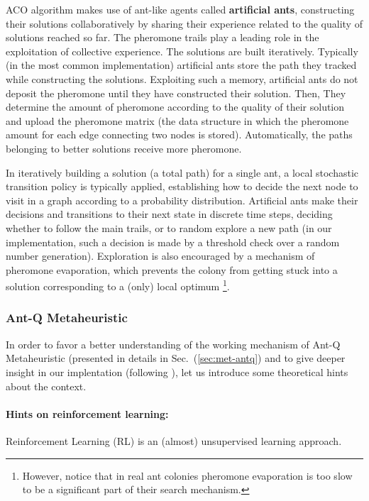 \documentclass[10pt]{article}
\begin{document}
ACO  algorithm  makes use  of ant-like agents called \textbf{artificial ants}, constructing their solutions collaboratively by sharing their experience related to the quality of solutions reached so far.
The pheromone trails play  a  leading  role  in  the  exploitation of collective experience.
The solutions are built iteratively.
Typically (in the most common implementation) artificial  ants  store  the  path  they  tracked while  constructing  the solutions.  
Exploiting such a memory, artificial  ants  do not deposit  the pheromone until they have constructed their solution. 
Then, They determine the amount of pheromone according  to  the  quality  of  their  solution  and upload the pheromone matrix (the data structure in which the pheromone amount for each edge connecting two nodes is stored). 
Automatically, the paths belonging to better solutions receive  more pheromone.

In iteratively building a solution (a total path) for a single ant, a local stochastic  transition policy is typically applied, establishing how to decide the next node to visit in a graph according to a probability distribution. Artificial  ants  make  their  decisions  and  transitions  to  their  next  state  in  discrete  time steps, deciding whether to follow the main trails, or to random explore a new path (in our implementation, such a decision is made by a threshold check over a random number generation).
Exploration is also encouraged  by a mechanism of  pheromone  evaporation, which prevents the  colony from  getting stuck into a solution corresponding to a (only) local optimum \footnote{However, notice that in real ant colonies pheromone evaporation is too slow to be a significant part of their search mechanism.}.

\subsubsection{Ant-Q Metaheuristic}\label{sec:antq}
In order to favor a better understanding of the working mechanism of Ant-Q Metaheuristic (presented in details in Sec.~(\ref{sec:met-antq}) and to give deeper insight in our implentation (following \cite{undici} ), let us introduce some theoretical hints about the context.
\paragraph{Hints on reinforcement learning:}
Reinforcement  Learning  (RL)  is  an  (almost) unsupervised  learning  approach.
\end{document}
